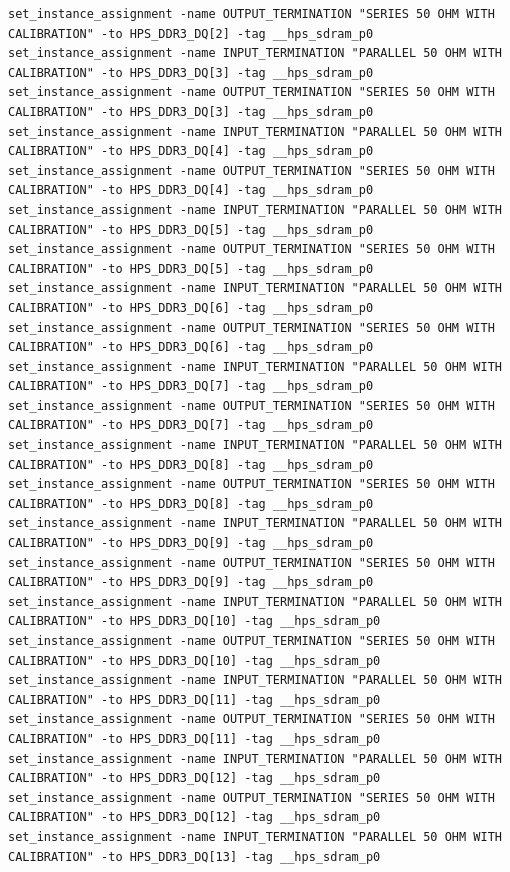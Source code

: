\documentclass[conference]{IEEEtran}
\begin{document}
\begin{lstlisting}
set_instance_assignment -name OUTPUT_TERMINATION "SERIES 50 OHM WITH CALIBRATION" -to HPS_DDR3_DQ[2] -tag __hps_sdram_p0
set_instance_assignment -name INPUT_TERMINATION "PARALLEL 50 OHM WITH CALIBRATION" -to HPS_DDR3_DQ[3] -tag __hps_sdram_p0
set_instance_assignment -name OUTPUT_TERMINATION "SERIES 50 OHM WITH CALIBRATION" -to HPS_DDR3_DQ[3] -tag __hps_sdram_p0
set_instance_assignment -name INPUT_TERMINATION "PARALLEL 50 OHM WITH CALIBRATION" -to HPS_DDR3_DQ[4] -tag __hps_sdram_p0
set_instance_assignment -name OUTPUT_TERMINATION "SERIES 50 OHM WITH CALIBRATION" -to HPS_DDR3_DQ[4] -tag __hps_sdram_p0
set_instance_assignment -name INPUT_TERMINATION "PARALLEL 50 OHM WITH CALIBRATION" -to HPS_DDR3_DQ[5] -tag __hps_sdram_p0
set_instance_assignment -name OUTPUT_TERMINATION "SERIES 50 OHM WITH CALIBRATION" -to HPS_DDR3_DQ[5] -tag __hps_sdram_p0
set_instance_assignment -name INPUT_TERMINATION "PARALLEL 50 OHM WITH CALIBRATION" -to HPS_DDR3_DQ[6] -tag __hps_sdram_p0
set_instance_assignment -name OUTPUT_TERMINATION "SERIES 50 OHM WITH CALIBRATION" -to HPS_DDR3_DQ[6] -tag __hps_sdram_p0
set_instance_assignment -name INPUT_TERMINATION "PARALLEL 50 OHM WITH CALIBRATION" -to HPS_DDR3_DQ[7] -tag __hps_sdram_p0
set_instance_assignment -name OUTPUT_TERMINATION "SERIES 50 OHM WITH CALIBRATION" -to HPS_DDR3_DQ[7] -tag __hps_sdram_p0
set_instance_assignment -name INPUT_TERMINATION "PARALLEL 50 OHM WITH CALIBRATION" -to HPS_DDR3_DQ[8] -tag __hps_sdram_p0
set_instance_assignment -name OUTPUT_TERMINATION "SERIES 50 OHM WITH CALIBRATION" -to HPS_DDR3_DQ[8] -tag __hps_sdram_p0
set_instance_assignment -name INPUT_TERMINATION "PARALLEL 50 OHM WITH CALIBRATION" -to HPS_DDR3_DQ[9] -tag __hps_sdram_p0
set_instance_assignment -name OUTPUT_TERMINATION "SERIES 50 OHM WITH CALIBRATION" -to HPS_DDR3_DQ[9] -tag __hps_sdram_p0
set_instance_assignment -name INPUT_TERMINATION "PARALLEL 50 OHM WITH CALIBRATION" -to HPS_DDR3_DQ[10] -tag __hps_sdram_p0
set_instance_assignment -name OUTPUT_TERMINATION "SERIES 50 OHM WITH CALIBRATION" -to HPS_DDR3_DQ[10] -tag __hps_sdram_p0
set_instance_assignment -name INPUT_TERMINATION "PARALLEL 50 OHM WITH CALIBRATION" -to HPS_DDR3_DQ[11] -tag __hps_sdram_p0
set_instance_assignment -name OUTPUT_TERMINATION "SERIES 50 OHM WITH CALIBRATION" -to HPS_DDR3_DQ[11] -tag __hps_sdram_p0
set_instance_assignment -name INPUT_TERMINATION "PARALLEL 50 OHM WITH CALIBRATION" -to HPS_DDR3_DQ[12] -tag __hps_sdram_p0
set_instance_assignment -name OUTPUT_TERMINATION "SERIES 50 OHM WITH CALIBRATION" -to HPS_DDR3_DQ[12] -tag __hps_sdram_p0
set_instance_assignment -name INPUT_TERMINATION "PARALLEL 50 OHM WITH CALIBRATION" -to HPS_DDR3_DQ[13] -tag __hps_sdram_p0

\end{lstlisting}
\end{document}
